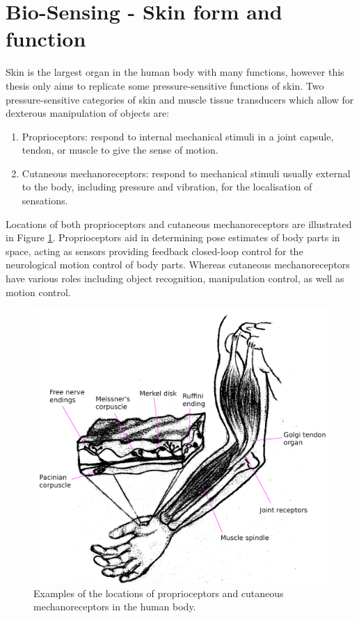 \section{Bio-Sensing - Skin form and function}
Skin is the largest organ in the human body with many functions, however this thesis only aims to replicate some pressure-sensitive functions of skin. Two pressure-sensitive categories of skin and muscle tissue transducers which allow for dexterous manipulation of objects are:
\begin{enumerate} 
    \item Proprioceptors: respond to internal mechanical stimuli in a joint capsule, tendon, or muscle to give the sense of motion.
    \item Cutaneous mechanoreceptors:  respond to mechanical stimuli usually external to the body, including pressure and vibration, for the localisation of sensations. 
\end{enumerate} 
Locations of both proprioceptors and cutaneous mechanoreceptors are illustrated in Figure \ref{fig:proprioceptors-mechanoreceptors}. Proprioceptors aid in determining pose estimates of body parts in space, acting as sensors providing feedback closed-loop control for the neurological motion control of body parts. Whereas cutaneous mechanoreceptors have various roles including object recognition, manipulation control, as well as motion control.
\begin{figure}[H]
    \centering
    \includegraphics[width=0.6\linewidth]{Figures/propriocetors_n_cutaneous_mechanoreceptors_labelled.png}
    \caption{Examples of the locations of proprioceptors and cutaneous mechanoreceptors in the human body.}
    \label{fig:proprioceptors-mechanoreceptors}
\end{figure}

